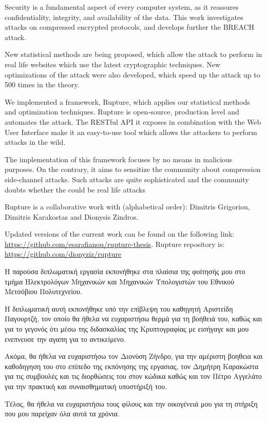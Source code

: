 \begin{abstracten}

Security is a fundamental aspect of every computer system, as it reassures
 confidentiality, integrity, and availability of the data. This work investigates
attacks on compressed encrypted protocols, and develops further the BREACH attack.

New statistical methods are being proposed, which allow the attack to perform in real life websites
which use the latest cryptographic techniques. New optimizations of the attack were also developed, which speed
up the attack up to 500 times in the theory.

We implemented a framework, Rupture, which applies our statistical methods and 
optimization techniques. Rupture is open-source, production level and automates the attack.
The RESTful API it exposes in combination with the Web User Interface make it an easy-to-use tool 
which allows the attackers to perform attacks in the wild.

The implementation of this framework focuses by no means in malicious purposes. On the contrary,
it aims to sensitize the community about compression side-channel attacks. Such attacks are quite 
sophisticated and the community doubts whether the could be real life attacks

Rupture is a collaborative work with (alphabetical order): Dimitris Grigoriou, Dimitris Karakostas
and Dionysis Zindros.

Updated versions of the current work can be found on the following link:
\url{https://github.com/esarafianou/rupture-thesis}. Rupture repository is:
\url{https://github.com/dionyziz/rupture}

\end{abstracten}

\begin{acknowledgementsgr}
Η παρούσα διπλωματική εργασία εκπονήθηκε στα πλαίσια της φοίτησής μου στο τμήμα
Ηλεκτρολόγων Μηχανικών και Μηχανικών Υπολογιστών του Εθνικού Μετσόβιου
Πολυτεχνείου.

Η διπλωματική αυτή εκπονήθηκε υπό την επίβλεψη του καθηγητή Αριστείδη Παγουρτζή,
τον οποίο θα ήθελα να ευχαριστήσω θερμά για τη βοήθειά του, καθώς και για το
γεγονός ότι μέσω της διδασκαλίας της Κρυπτογραφίας με εισήγαγε
και μου ενεπνευσε την αγαπη για το αντικείμενο.

Ακόμα, θα ήθελα να ευχαριστήσω τον Διονύση Ζήνδρο, για την αμέριστη βοηθεια και καθοδηγηση του
στο επίπεδο της εκπόνησης της εργασιας, τον Δημήτρη Καρακώστα για τις συμβουλές και
τις διορθώσεις του στον κώδικα καθώς και τον Πέτρο Αγγελάτο για την πρακτική και συναισθηματική υποστήριξή του.

Τέλος, θα ήθελα να ευχαριστήσω τους φίλους και την οικογένειά μου για τη στήριξη
που μου παρείχαν όλα αυτά τα χρόνια.

\end{acknowledgementsgr}
